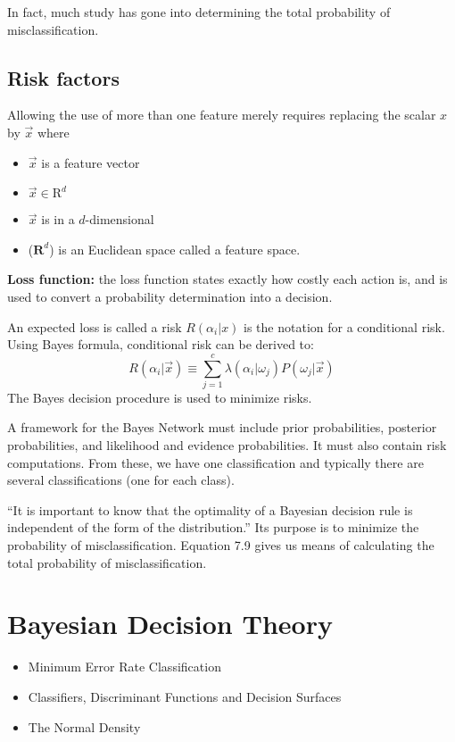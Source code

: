 \documentclass[11pt]{article}
\begin{document}
In fact, much study has gone into determining the total probability of misclassification.

\subsection{Risk factors} \cite[25]{duda-hart-stork}
Allowing the use of more than one feature merely requires replacing the scalar $x$ by $\vec{x}$  where 
\begin{itemize}
	\item $\vec{x}$ is a feature vector
	\item $\vec{x} \in \mathrm{R}^d$ 
	\item $\vec{x}$ is in a $d$-dimensional 
	\item ($\mathbf{R}^d$) is an Euclidean space called a feature space.
\end{itemize}

\textbf{Loss function:} the loss function states exactly how costly each action is, and is used to convert a probability determination into a decision.  

An expected loss is called a risk $R(\alpha_i | x)$ is the notation for a conditional risk.  Using Bayes formula, conditional risk can be derived to:
\[ 
R(\alpha_i | \vec{x}) \equiv \sum _{j=1} ^c \lambda (\alpha_i | \omega_j) P(\omega_j | \vec{x})
\]
The Bayes decision procedure is used to minimize risks.  





A framework for the Bayes Network must include prior probabilities, posterior probabilities, and likelihood and evidence probabilities.  It must also contain risk computations.    From these, we have one classification and typically there are several classifications (one for each class).


``It is important  to know that the optimality of a Bayesian decision rule is independent of the form of the distribution.''\cite{nadler}  Its purpose is to minimize the probability of misclassification.   Equation 7.9 gives us means of calculating the total probability of misclassification.

\section{Bayesian Decision Theory}
\begin{itemize}
	\item Minimum Error Rate Classification
	\item Classifiers, Discriminant Functions and Decision Surfaces
	\item The Normal Density
\end{itemize}
\end{document}
